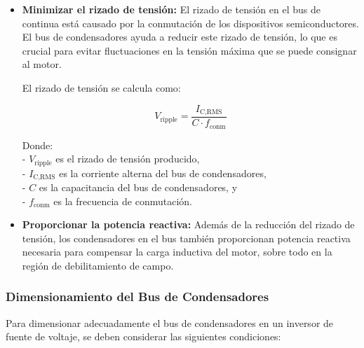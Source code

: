 \begin{itemize}
	\item \textbf{Minimizar el rizado de tensión:} El rizado de tensión en el bus de continua está causado por la conmutación de los dispositivos semiconductores. El bus de condensadores ayuda a reducir este rizado de tensión, lo que es crucial para evitar fluctuaciones en la tensión máxima que se puede consignar al motor.
	
	El rizado de tensión se calcula como:
	
	\[
	V_{\text{ripple}} = \frac{I_{\text{C,RMS}}}{C \cdot f_{\text{conm}}}
	\]
	
	Donde:\\
	- \( V_{\text{ripple}} \) es el rizado de tensión producido,\\
	- \( I_{\text{C,RMS}} \) es la corriente alterna del bus de condensadores,\\
	- \( C \) es la capacitancia del bus de condensadores, y\\
	- \( f_{\text{conm}} \) es la frecuencia de conmutación.\\
	
	\item \textbf{Proporcionar la potencia reactiva:} Además de la reducción del rizado de tensión, los condensadores en el bus también proporcionan potencia reactiva necesaria para compensar la carga inductiva del motor, sobre todo en la región de debilitamiento de campo.
	
\end{itemize}

\subsubsection{Dimensionamiento del Bus de Condensadores}

Para dimensionar adecuadamente el bus de condensadores en un inversor de fuente de voltaje, se deben considerar las siguientes condiciones:

